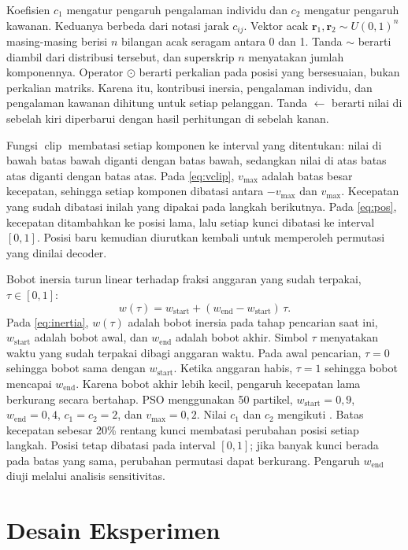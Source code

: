 \documentclass[conference]{IEEEtran}
\begin{document}
Koefisien $c_1$ mengatur pengaruh pengalaman individu dan $c_2$ mengatur pengaruh kawanan. Keduanya berbeda dari notasi jarak $c_{ij}$. Vektor acak $\mathbf{r}_1,\mathbf{r}_2\sim U(0,1)^n$ masing-masing berisi $n$ bilangan acak seragam antara 0 dan 1. Tanda $\sim$ berarti diambil dari distribusi tersebut, dan superskrip $n$ menyatakan jumlah komponennya. Operator $\odot$ berarti perkalian pada posisi yang bersesuaian, bukan perkalian matriks. Karena itu, kontribusi inersia, pengalaman individu, dan pengalaman kawanan dihitung untuk setiap pelanggan. Tanda $\leftarrow$ berarti nilai di sebelah kiri diperbarui dengan hasil perhitungan di sebelah kanan.

Fungsi $\operatorname{clip}$ membatasi setiap komponen ke interval yang ditentukan: nilai di bawah batas bawah diganti dengan batas bawah, sedangkan nilai di atas batas atas diganti dengan batas atas. Pada \eqref{eq:vclip}, $v_{\max}$ adalah batas besar kecepatan, sehingga setiap komponen dibatasi antara $-v_{\max}$ dan $v_{\max}$. Kecepatan yang sudah dibatasi inilah yang dipakai pada langkah berikutnya. Pada \eqref{eq:pos}, kecepatan ditambahkan ke posisi lama, lalu setiap kunci dibatasi ke interval $[0,1]$. Posisi baru kemudian diurutkan kembali untuk memperoleh permutasi yang dinilai decoder.

Bobot inersia turun linear terhadap fraksi anggaran yang sudah terpakai, $\tau\in[0,1]$:
\begin{equation}
w(\tau)=w_{\text{start}}+(w_{\text{end}}-w_{\text{start}})\,\tau.\label{eq:inertia}
\end{equation}
Pada \eqref{eq:inertia}, $w(\tau)$ adalah bobot inersia pada tahap pencarian saat ini, $w_{\text{start}}$ adalah bobot awal, dan $w_{\text{end}}$ adalah bobot akhir. Simbol $\tau$ menyatakan waktu yang sudah terpakai dibagi anggaran waktu. Pada awal pencarian, $\tau=0$ sehingga bobot sama dengan $w_{\text{start}}$. Ketika anggaran habis, $\tau=1$ sehingga bobot mencapai $w_{\text{end}}$. Karena bobot akhir lebih kecil, pengaruh kecepatan lama berkurang secara bertahap.
PSO menggunakan 50 partikel, $w_{\text{start}}=0{,}9$, $w_{\text{end}}=0{,}4$, $c_1=c_2=2$, dan $v_{\max}=0{,}2$. Nilai $c_1$ dan $c_2$ mengikuti \cite{kennedy1995}. Batas kecepatan sebesar 20\% rentang kunci membatasi perubahan posisi setiap langkah. Posisi tetap dibatasi pada interval $[0,1]$; jika banyak kunci berada pada batas yang sama, perubahan permutasi dapat berkurang. Pengaruh $w_{\text{end}}$ diuji melalui analisis sensitivitas.

\section{Desain Eksperimen}\label{sec:desain}
\end{document}
